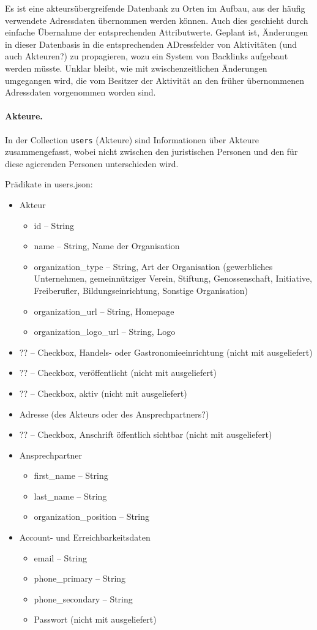 \documentclass[a4paper,11pt]{article}
\begin{document}
Es ist eine akteursübergreifende Datenbank zu Orten im Aufbau, aus der häufig
verwendete Adressdaten übernommen werden können.  Auch dies geschieht durch
einfache Übernahme der entsprechenden Attributwerte. Geplant ist, Änderungen
in dieser Datenbasis in die entsprechenden ADressfelder von Aktivitäten (und
auch Akteuren?) zu propagieren, wozu ein System von Backlinks aufgebaut werden
müsste. Unklar bleibt, wie mit zwischenzeitlichen Änderungen umgegangen wird,
die vom Besitzer der Aktivität an den früher übernommenen Adressdaten
vorgenommen worden sind.

\paragraph{Akteure.}
In der Collection \texttt{users} (Akteure) sind Informationen über Akteure
zusammengefasst, wobei nicht zwischen den juristischen Personen und den für
diese agierenden Personen unterschieden wird. 

Prädikate in users.json:
\begin{itemize}
\item Akteur
\begin{itemize}
  \item id -- String
  \item name -- String, Name der Organisation
  \item organization\_type -- String, Art der Organisation (gewerbliches
    Unternehmen, gemeinnütziger Verein, Stiftung, Genossenschaft, Initiative,
    Freiberufler, Bildungseinrichtung, Sonstige Organisation)
  \item organization\_url -- String, Homepage
  \item organization\_logo\_url -- String, Logo
\end{itemize}
\item ?? -- Checkbox, Handels- oder Gastronomieeinrichtung (nicht mit
  ausgeliefert)
\item ?? -- Checkbox, veröffentlicht (nicht mit ausgeliefert)
\item ?? -- Checkbox, aktiv (nicht mit ausgeliefert)
\item Adresse (des Akteurs oder des Ansprechpartners?)
\item ?? -- Checkbox, Anschrift öffentlich sichtbar (nicht mit ausgeliefert)
\item Ansprechpartner
\begin{itemize}
  \item first\_name -- String
  \item last\_name -- String
  \item organization\_position -- String
\end{itemize}
\item Account- und Erreichbarkeitsdaten
\begin{itemize}
  \item email -- String
  \item phone\_primary -- String
  \item phone\_secondary -- String
  \item Passwort (nicht mit ausgeliefert)
\end{itemize}
\end{itemize}
\end{document}

